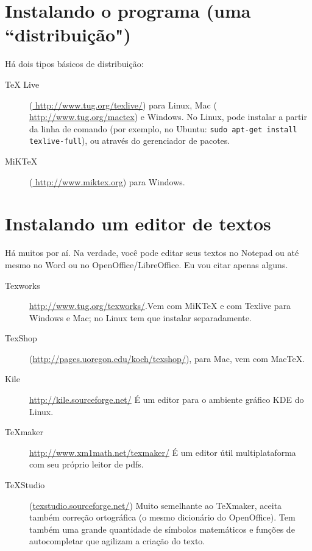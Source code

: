 \documentclass[a4paper,nols,bidi]{tufte-book}
\begin{document}
\section{Instalando o programa (uma ``distribuição")}
\label{distribuicoes}
Há dois tipos básicos de distribuição:
\begin{description}
\item [TeX Live] (\url{ http://www.tug.org/texlive/}) para Linux, Mac  (\url{ http://www.tug.org/mactex}) e Windows. No Linux, pode instalar a partir da linha de comando (por exemplo, no Ubuntu: \texttt{sudo apt-get install texlive-full}), ou através do gerenciador de pacotes. 
\item[MiKTeX]  (\url{ http://www.miktex.org}) para Windows.

\end{description}

\section{Instalando um editor de textos}
Há muitos por aí. Na verdade, você pode editar seus textos no Notepad ou até mesmo no Word ou no OpenOffice/LibreOffice.  Eu vou citar apenas alguns.

\begin{description}

\item[Texworks] \url{http://www.tug.org/texworks/}.Vem com MiKTeX e com Texlive para Windows e Mac; no Linux tem que instalar separadamente. 

\item [TexShop] (\url{http://pages.uoregon.edu/koch/texshop/}), para Mac, vem com MacTeX.

\item [Kile] \url{http://kile.sourceforge.net/}
É um editor para o ambiente gráfico KDE do Linux.

\item [TeXmaker] \url{http://www.xm1math.net/texmaker/}
É um editor útil multiplataforma com seu próprio leitor de pdfs.

\item  [TeXStudio] (\url{texstudio.sourceforge.net/})
Muito semelhante ao TeXmaker, aceita também correção ortográfica (o mesmo dicionário do OpenOffice). Tem também uma grande quantidade de símbolos matemáticos e funções de autocompletar que agilizam a criação do texto.

\end{description}
\end{document}
